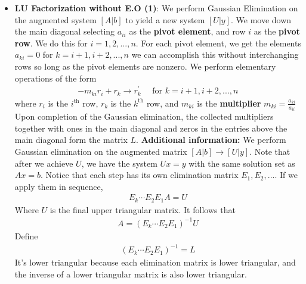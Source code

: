 \documentclass{report}
\begin{document}
\begin{itemize}
        \item \textbf{LU Factorization without E.O (1)}: We perform Gaussian Elimination on the augmented system $[A|b] $ to yield a new system $[U|y]$.
            \bigbreak \noindent 
        We move down the main diagonal selecting $a_{ii}$ as the \textbf{pivot element}, and row $i$ as the \textbf{pivot row}. We do this for $i = 1,2,...,n$. For each pivot element, we get the elements $a_{ki} = 0$ for $k=i+1,i+2,...,n$ we can accomplish this without interchanging rows so long as the pivot elements are nonzero.
        \bigbreak \noindent 
        We perform elementary operations of the form
        \begin{align*}
            -m_{ki}r_{i} + r_{k} \to r_{k}^{\prime} \quad \text{ for } k = i+1,i+2,...,n
        \end{align*}
        where $r_{i}$ is the $i^{\text{th}}$ row, $r_{k}$ is the $k^{\text{th}}$ row, and $m_{ki}$ is the \textbf{multiplier} $m_{ki} = \frac{a_{ki}}{a_{ii}} $
        \bigbreak \noindent 
        Upon completion of the Gaussian elimination, the collected multipliers together with ones in the main diagonal and zeros in the entries above the main diagonal form the matrix $L$.
        \bigbreak \noindent 
        \textbf{Additional information:} We perform Gaussian elimination on the augmented matrix $[A|b] \to [U|y]$. Note that after we achieve $U$, we have the system $Ux = y$ with the same solution set as $Ax = b$. 
        \bigbreak \noindent 
        Notice that each step has its own elimination matrix $E_{1},E_{2},... $. If we apply them in sequence,
        \begin{align*}
            E_{k} \cdots E_{2}E_{1}A = U
        \end{align*}
        Where $U$ is the final upper triangular matrix. It follows that 
        \begin{align*}
            A = (E_{k} \cdots E_{2}E_{1})^{-1}U
        \end{align*}
        Define 
        \begin{align*}
            (E_{k} \cdots E_{2}E_{1})^{-1} = L
        \end{align*}
        It’s lower triangular because each elimination matrix is lower triangular, and the inverse of a lower triangular matrix is also lower triangular.
        \bigbreak \noindent 


\end{itemize}
\end{document}
